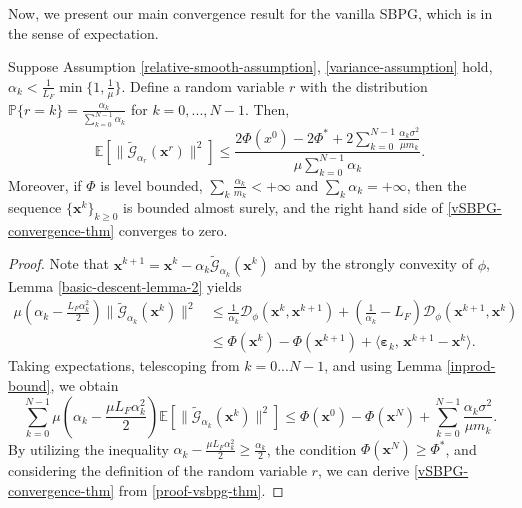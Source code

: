 \documentclass[twoside,11pt]{article}
\newcommand{\be}{\begin{equation}}
\newcommand{\ee}{\end{equation}}
\newcommand{\E}{\mathbb{E}}
\newcommand{\cD}{\mathcal D}
\newcommand{\cG}{\mathcal G}
\def\inprod#1#2{\langle#1,\,#2\rangle}
\def\vx{{\bm{x}}}
\begin{document}
Now, we present our main convergence result for the vanilla SBPG, which is in the sense of expectation.
\begin{theorem}
  Suppose Assumption \ref{relative-smooth-assumption}, \ref{variance-assumption} hold, $\alpha_k<\frac{1}{L_F}\min\{1,\frac{1}{\mu}\}$. Define a random variable $r$ with the distribution $\mathbb{P}\{r=k\}=\frac{\alpha_k}{\sum_{k=0}^{N-1}\alpha_k}$ for $k=0,...,N-1$. Then,
\be\label{vSBPG-convergence-thm}
 \E[\|\widetilde{\mathcal G}_{\alpha_r}(\vx^{r})\|^2]\leq\frac{2\Phi(x^0)-2\Phi^*+2\sum_{k=0}^{N-1}\frac{\alpha_k\sigma^2}{\mu m_k}}{\mu\sum_{k=0}^{N-1}\alpha_k}.
\ee
  Moreover, if $\Phi$ is level bounded, $\sum_{k}\frac{\alpha_k}{m_k}<+\infty$ and $\sum_{k}\alpha_k=+\infty$, then the sequence $\{{\vx^k}\}_{k\geq0}$ is bounded almost surely, and the right hand side of \eqref{vSBPG-convergence-thm} converges to zero.
 \label{converge-thm-vanilla-expt}
\end{theorem}
\begin{proof}
    Note that ${\vx^{k+1}}={\vx^k}-\alpha_k\widetilde{\cG}_{\alpha_k}({\vx^k})$ and by the strongly convexity of $\phi$, Lemma \ref{basic-descent-lemma-2} yields 
\[
\begin{aligned}
    \mu(\alpha_k-\frac{L_F\alpha_k^2}{2})\|\widetilde{\cG}_{\alpha_k}({\vx^k})\|^2&\leq\frac{1}{\alpha_k}\cD_\phi({\vx^k},{\vx^{k+1}})+\left(\frac{1}{\alpha_k}-L_F\right)\cD_\phi({\vx^{k+1}},{\vx^k})\\
    &\leq\Phi({\vx^k})-\Phi({\vx^{k+1}})+\inprod{{\bm\varepsilon}_k}{{\vx^{k+1}}-{\vx^k}}.
\end{aligned}
\]
Taking expectations, telescoping from $k=0...N-1$, and using Lemma \ref{inprod-bound}, we obtain
\be
 \sum_{k=0}^{N-1}\mu(\alpha_k-\frac{\mu L_F\alpha_k^2}{2})\E[\|\widetilde{\mathcal G}_{\alpha_k}({\vx^k})\|^2]\leq\Phi(\vx^0)-\Phi(\vx^N)+\sum_{k=0}^{N-1}\frac{\alpha_k\sigma^2}{\mu m_k}.
 \label{proof-vsbpg-thm}
\ee
By utilizing the inequality $\alpha_k - \frac{\mu L_F \alpha_k^2}{2} \geq \frac{\alpha_k}{2}$, the condition $\Phi(\vx^N) \geq \Phi^*$, and considering the definition of the random variable $r$, we can derive \eqref{vSBPG-convergence-thm} from \eqref{proof-vsbpg-thm}. 
\end{proof}
\end{document}
